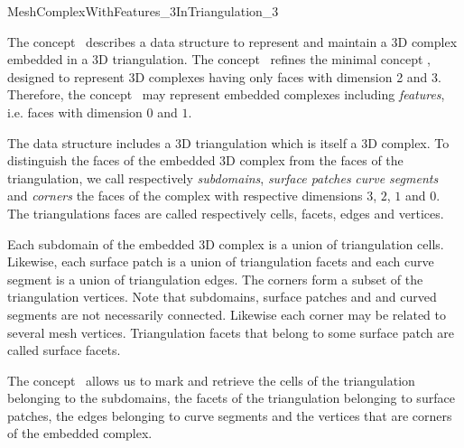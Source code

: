 \ccRefPageBegin


\begin{ccRefConcept}{MeshComplexWithFeatures_3InTriangulation_3}


\ccDefinition
  
The concept \ccRefName\ describes a data structure 
to represent and maintain a 3D complex embedded in a 3D triangulation.
The concept \ccRefName\  refines the minimal concept 
, designed to represent 
3D complexes having only faces with dimension 2 and 3.
Therefore, the concept \ccRefName\   may represent embedded complexes
including {\em features}, i.e. faces with dimension $0$ and $1$.

The data structure includes a 3D triangulation which is itself a 3D complex.
To distinguish the faces of the embedded 3D complex from the
faces of the triangulation,
 we call  
respectively {\em subdomains}, 
{\em surface patches}
{\em curve segments} and {\em corners} the faces
of the complex with respective dimensions $3$, $2$, $1$ and $0$.
The triangulations faces  are called respectively
cells, facets, edges and vertices.

Each subdomain of the embedded 3D complex is a union of 
triangulation cells.
Likewise,  each surface patch  is a union of 
triangulation facets and each curve segment is a union of triangulation edges.
The corners form a subset of the triangulation vertices.
Note that subdomains, surface patches and and curved segments are not
necessarily connected. Likewise each corner may be related to several
mesh vertices.
 Triangulation facets that belong to some
surface patch are  called surface facets.


The concept \ccRefName\  allows us to  mark and retrieve  the 
cells of the triangulation belonging to the subdomains,
the facets of the triangulation belonging to  surface patches,
the edges belonging to curve segments and the vertices that are corners of the embedded complex.


\end{ccRefConcept}
